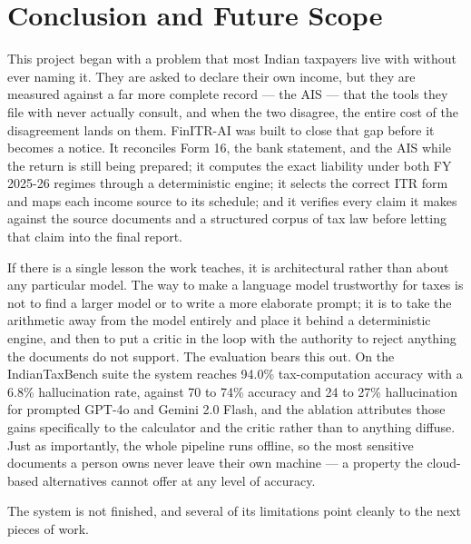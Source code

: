 \documentclass[12pt, a4paper, oneside]{report}
\begin{document}

\chapter{Conclusion and Future Scope}
\label{chap:conclusion}

This project began with a problem that most Indian taxpayers live with without
ever naming it. They are asked to declare their own income, but they are
measured against a far more complete record --- the AIS --- that the tools they
file with never actually consult, and when the two disagree, the entire cost of
the disagreement lands on them. FinITR-AI was built to close that gap before it
becomes a notice. It reconciles Form 16, the bank statement, and the AIS while
the return is still being prepared; it computes the exact liability under both
FY 2025-26 regimes through a deterministic engine; it selects the correct ITR
form and maps each income source to its schedule; and it verifies every claim it
makes against the source documents and a structured corpus of tax law before
letting that claim into the final report.

If there is a single lesson the work teaches, it is architectural rather than
about any particular model. The way to make a language model trustworthy for
taxes is not to find a larger model or to write a more elaborate prompt; it is to
take the arithmetic away from the model entirely and place it behind a
deterministic engine, and then to put a critic in the loop with the authority to
reject anything the documents do not support. The evaluation bears this out. On
the IndianTaxBench suite the system reaches 94.0\% tax-computation accuracy with
a 6.8\% hallucination rate, against 70 to 74\% accuracy and 24 to 27\%
hallucination for prompted GPT-4o and Gemini 2.0 Flash, and the ablation
attributes those gains specifically to the calculator and the critic rather than
to anything diffuse. Just as importantly, the whole pipeline runs offline, so
the most sensitive documents a person owns never leave their own machine --- a
property the cloud-based alternatives cannot offer at any level of accuracy.

The system is not finished, and several of its limitations point cleanly to the
next pieces of work.
\end{document}
